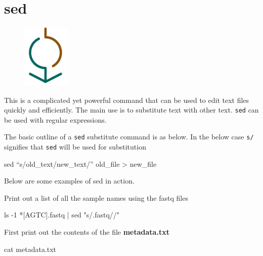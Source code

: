 \documentclass[
  letterpaper,
  DIV=11,
  numbers=noendperiod]{scrreprt}
\newenvironment{Shaded}{\begin{snugshade}}{\end{snugshade}}
\newcommand{\AttributeTok}[1]{\textcolor[rgb]{0.40,0.45,0.13}{#1}}
\newcommand{\FunctionTok}[1]{\textcolor[rgb]{0.28,0.35,0.67}{#1}}
\newcommand{\KeywordTok}[1]{\textcolor[rgb]{0.00,0.23,0.31}{#1}}
\newcommand{\NormalTok}[1]{\textcolor[rgb]{0.00,0.23,0.31}{#1}}
\newcommand{\OperatorTok}[1]{\textcolor[rgb]{0.37,0.37,0.37}{#1}}
\newcommand{\PreprocessorTok}[1]{\textcolor[rgb]{0.68,0.00,0.00}{#1}}
\newcommand{\SpecialStringTok}[1]{\textcolor[rgb]{0.13,0.47,0.30}{#1}}
\newcommand{\StringTok}[1]{\textcolor[rgb]{0.13,0.47,0.30}{#1}}
\begin{document}
\hypertarget{sed}{%
\section{sed}\label{sed}}

\begin{figure}

{\centering \includegraphics[width=0.2\textwidth,height=\textheight]{figures/sed.png}

}

\end{figure}

This is a complicated yet powerful command that can be used to edit text
files quickly and efficiently. The main use is to substitute text with
other text. \texttt{sed} can be used with regular expressions.

The basic outline of a \texttt{sed} substitute command is as below. In
the below case \texttt{s/} signifies that \texttt{sed} will be used for
substitution

\begin{Shaded}
\begin{Highlighting}[]
\FunctionTok{sed}\NormalTok{ “s/old\_text/new\_text/” old\_file }\OperatorTok{\textgreater{}}\NormalTok{ new\_file}
\end{Highlighting}
\end{Shaded}

Below are some examples of sed in action.

Print out a list of all the sample names using the fastq files

\begin{Shaded}
\begin{Highlighting}[]
\FunctionTok{ls} \AttributeTok{{-}1} \PreprocessorTok{*[}\SpecialStringTok{AGTC}\PreprocessorTok{]}\NormalTok{.fastq }\KeywordTok{|} \FunctionTok{sed} \StringTok{"s/.fastq//"}
\end{Highlighting}
\end{Shaded}

First print out the contents of the file \textbf{metadata.txt}

\begin{Shaded}
\begin{Highlighting}[]
\FunctionTok{cat}\NormalTok{ metadata.txt}
\end{Highlighting}
\end{Shaded}
\end{document}
